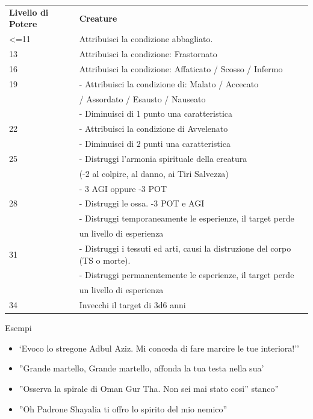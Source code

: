 \documentclass[a4paper,11pt,twoside,openany]{book}
\begin{document}
	\bigskip
	
	\begin{tabular}{L{3cm} L{13cm}}
		\toprule 
		\textbf{Livello di Potere} & \textbf{Creature}\tabularnewline
		<=11 &Attribuisci la condizione abbagliato. \\
		13 & Attribuisci la condizione: Frastornato\\
		16 & Attribuisci la condizione: Affaticato / Scosso / Infermo\\
		19 & - Attribuisci la condizione di: Malato / Accecato\\
		& / Assordato / Esausto / Nauseato\\
		& - Diminuisci di 1 punto una caratteristica\\
		22 & - Attribuisci la condizione di Avvelenato\\
		& - Diminuisci di 2 punti una caratteristica\\
		25 & - Distruggi l’armonia spirituale della creatura \\
		&(-2 al colpire, al danno, ai Tiri Salvezza)\\
		& - 3 AGI oppure -3 POT\\
		28 & - Distruggi le ossa. -3 POT e AGI\\
		& - Distruggi temporaneamente le esperienze, il target perde\\
		& un livello di esperienza\\
		31& - Distruggi i tessuti ed arti, causi la distruzione del corpo (TS o morte).\\
		& - Distruggi permanentemente le esperienze, il target perde\\
		&un livello di esperienza\\
		34 &Invecchi il target di 3d6 anni\\
	\end{tabular}
	
	\bigskip
	
	Esempi
	\begin{itemize}
		\item 
		`Evoco lo stregone Adbul Aziz. Mi conceda di fare marcire le tue interiora!'' 
		\item 
		''Grande martello, Grande martello, affonda la tua testa nella sua' 
		\item 
		''Osserva la spirale di Oman Gur Tha. Non sei mai stato cosi'' stanco'' 
		\item 
		''Oh Padrone Shayalia ti offro lo spirito del mio nemico'' 
	\end{itemize}
	
\end{document}
